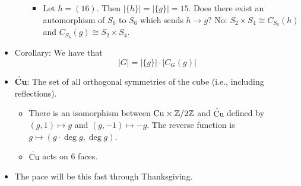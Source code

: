 \documentclass[../notes.tex]{subfiles}
\begin{document}
\begin{itemize}
\begin{itemize}
\begin{itemize}
            \item Let $h=(16)$. Then $|\{h\}|=|\{g\}|=15$. Does there exist an automorphism of $S_6$ to $S_6$ which sends $h\to g$? No: $S_2\times S_4\cong C_{S_6}(h)$ and $C_{S_6}(g)\cong S_2\times S_4$.
        \end{itemize}
    \end{itemize}
    \item Corollary: We have that
    \begin{equation*}
        |G| = |\{g\}|\cdot|C_G(g)|
    \end{equation*}
    \item $\bm{\widetilde{\textbf{Cu}}}$: The set of all orthogonal symmetries of the cube (i.e., including reflections).
    \begin{itemize}
        \item There is an isomorphism between $\text{Cu}\times\mathbb{Z}/2\mathbb{Z}$ and $\widetilde{\text{Cu}}$ defined by $(g,1)\mapsto g$ and $(g,-1)\mapsto -g$. The reverse function is $g\mapsto(g\cdot\deg g,\deg g)$.
        \item $\widetilde{\text{Cu}}$ acts on 6 faces.
    \end{itemize}
    \item The pace will be this fast through Thanksgiving.
\end{itemize}
\end{document}
